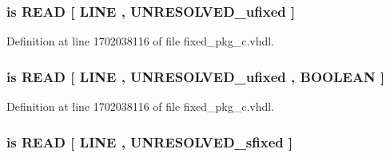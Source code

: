 \hypertarget{classfixed__pkg_ad42b366c3257a3dc2dc2e77d106f4fbe}{}
\subsubsection[{bread}]{ {\bfseries \textcolor{keywordflow}{is}\textcolor{vhdlchar}{ }\textcolor{vhdlchar}{R\+E\+A\+D}\textcolor{vhdlchar}{ }\textcolor{vhdlchar}{\mbox{[}}\textcolor{vhdlchar}{ }\textcolor{vhdlchar}{L\+I\+N\+E}\textcolor{vhdlchar}{ }\textcolor{vhdlchar}{,}\textcolor{vhdlchar}{ }{\bfseries {\bf U\+N\+R\+E\+S\+O\+L\+V\+E\+D\+\_\+ufixed}} \textcolor{vhdlchar}{ }\textcolor{vhdlchar}{\mbox{]}}\textcolor{vhdlchar}{ }} \hspace{0.3cm}{\ttfamily [Alias]}}\label{classfixed__pkg_ad42b366c3257a3dc2dc2e77d106f4fbe}


Definition at line 1702038116 of file fixed\+\_\+pkg\+\_\+c.\+vhdl.

\hypertarget{classfixed__pkg_a29a6e1741e0c9fa33a11a2e3c413b0c7}{}
\subsubsection[{bread}]{ {\bfseries \textcolor{keywordflow}{is}\textcolor{vhdlchar}{ }\textcolor{vhdlchar}{R\+E\+A\+D}\textcolor{vhdlchar}{ }\textcolor{vhdlchar}{\mbox{[}}\textcolor{vhdlchar}{ }\textcolor{vhdlchar}{L\+I\+N\+E}\textcolor{vhdlchar}{ }\textcolor{vhdlchar}{,}\textcolor{vhdlchar}{ }{\bfseries {\bf U\+N\+R\+E\+S\+O\+L\+V\+E\+D\+\_\+ufixed}} \textcolor{vhdlchar}{ }\textcolor{vhdlchar}{,}\textcolor{vhdlchar}{ }\textcolor{comment}{B\+O\+O\+L\+E\+A\+N}\textcolor{vhdlchar}{ }\textcolor{vhdlchar}{\mbox{]}}\textcolor{vhdlchar}{ }} \hspace{0.3cm}{\ttfamily [Alias]}}\label{classfixed__pkg_a29a6e1741e0c9fa33a11a2e3c413b0c7}


Definition at line 1702038116 of file fixed\+\_\+pkg\+\_\+c.\+vhdl.

\hypertarget{classfixed__pkg_a7e3e38c629183dd757556d138bcc83f5}{}
\subsubsection[{bread}]{ {\bfseries \textcolor{keywordflow}{is}\textcolor{vhdlchar}{ }\textcolor{vhdlchar}{R\+E\+A\+D}\textcolor{vhdlchar}{ }\textcolor{vhdlchar}{\mbox{[}}\textcolor{vhdlchar}{ }\textcolor{vhdlchar}{L\+I\+N\+E}\textcolor{vhdlchar}{ }\textcolor{vhdlchar}{,}\textcolor{vhdlchar}{ }{\bfseries {\bf U\+N\+R\+E\+S\+O\+L\+V\+E\+D\+\_\+sfixed}} \textcolor{vhdlchar}{ }\textcolor{vhdlchar}{\mbox{]}}\textcolor{vhdlchar}{ }} \hspace{0.3cm}{\ttfamily [Alias]}}\label{classfixed__pkg_a7e3e38c629183dd757556d138bcc83f5}


